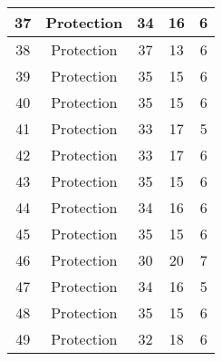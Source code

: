 \documentclass[results.tex]{subfiles}
\begin{document}
\begin{center}
\begin{tabular}{| c || c | c | c | c |}
            \hline
            37                      & Protection                   & 34                     & 16                      & 6                    \\
            \hline
            38                      & Protection                   & 37                     & 13                      & 6                    \\
            \hline
            39                      & Protection                   & 35                     & 15                      & 6                    \\
            \hline
            40                      & Protection                   & 35                     & 15                      & 6                    \\
            \hline
            41                      & Protection                   & 33                     & 17                      & 5                    \\
            \hline
            42                      & Protection                   & 33                     & 17                      & 6                    \\
            \hline
            43                      & Protection                   & 35                     & 15                      & 6                    \\
            \hline
            44                      & Protection                   & 34                     & 16                      & 6                    \\
            \hline
            45                      & Protection                   & 35                     & 15                      & 6                    \\
            \hline
            46                      & Protection                   & 30                     & 20                      & 7                    \\
            \hline
            47                      & Protection                   & 34                     & 16                      & 5                    \\
            \hline
            48                      & Protection                   & 35                     & 15                      & 6                    \\
            \hline
            49                      & Protection                   & 32                     & 18                      & 6                    \\
            \hline
        \end{tabular}
    \end{center}
\end{document}
